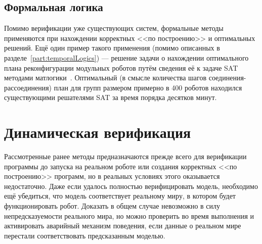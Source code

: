 \documentclass[a4, 14pt]{article}
\begin{document}
\subsection{Формальная логика}
Помимо верификации уже существующих систем, формальные методы применяются при 
нахождении корректных <<по построению>> и оптимальных решений. Ещё один пример 
такого применения (помимо описанных в разделе~\ref{part:temporalLogics}) --- решение 
задачи о нахождении оптимального плана реконфигурации модульных роботов путём 
сведения её к задаче SAT методами матлогики~\cite{gorbenko2012reconfigurable}. 
Оптимальный (в смысле количества шагов соединения-рассоединения) план для групп 
размером примерно в 400 роботов находился существующими решателями SAT за время 
порядка десятков минут.

\section{Динамическая верификация}
Рассмотренные ранее методы предназначаются прежде всего для верификации 
программы до запуска на реальном роботе или создания корректных <<по построению>> 
программ, но в реальных условиях этого оказывается недостаточно. Даже если 
удалось полностью верифицировать модель, необходимо ещё убедиться, что модель 
соответствует реальному миру, в котором будет функционировать робот. 
Доказать в общем случае невозможно в силу непредсказуемости реального мира, 
но можно проверить во время выполнения и активировать аварийный
механизм поведения, если данные о реальном мире перестали соответствовать 
предсказанным моделью.
\end{document}
